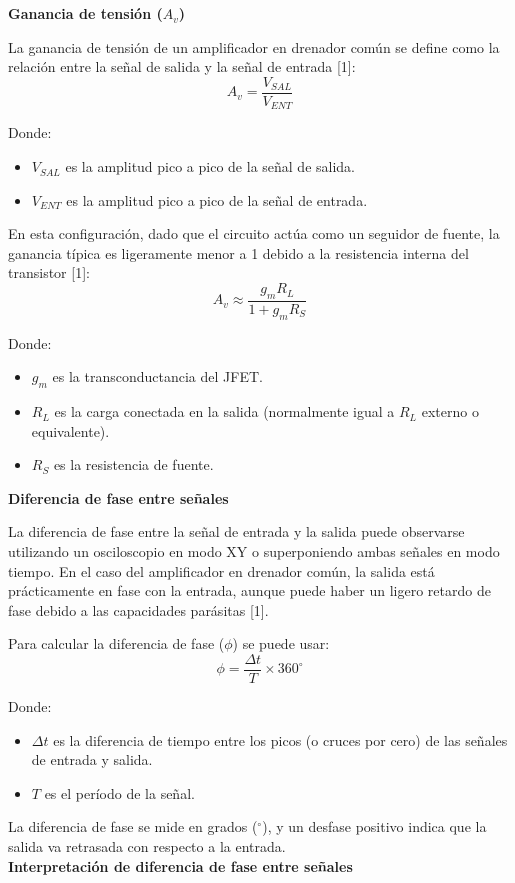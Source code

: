 \documentclass[journal]{IEEEtran}
\begin{document}
	\appendices
	\section{}
	\noindent\textbf{Ganancia de tensión ($A_v$)}
	\par La ganancia de tensión de un amplificador en drenador común se define como la relación entre la señal de salida y la señal de entrada [1]:
	\begin{equation}
	A_v = \frac{V_{SAL}}{V_{ENT}}
	\end{equation}
	\par Donde:
	\begin{itemize}
		\item $V_{SAL}$ es la amplitud pico a pico de la señal de salida.
		\item $V_{ENT}$ es la amplitud pico a pico de la señal de entrada.
	\end{itemize}
	\par En esta configuración, dado que el circuito actúa como un seguidor de fuente, la ganancia típica es ligeramente menor a 1 debido a la resistencia interna del transistor [1]:
	\begin{equation}
	A_v \approx \frac{g_m R_L}{1 + g_m R_S}
	\end{equation}
	\par Donde:
	\begin{itemize}
		\item $g_m$ es la transconductancia del JFET.
		\item $R_L$ es la carga conectada en la salida (normalmente igual a $R_L$ externo o equivalente).
		\item $R_S$ es la resistencia de fuente.
	\end{itemize}
	
	\textbf{Diferencia de fase entre señales}
	\par La diferencia de fase entre la señal de entrada y la salida puede observarse utilizando un osciloscopio en modo XY o superponiendo ambas señales en modo tiempo. En el caso del amplificador en drenador común, la salida está prácticamente en fase con la entrada, aunque puede haber un ligero retardo de fase debido a las capacidades parásitas [1].
	\par Para calcular la diferencia de fase ($\phi$) se puede usar:
	\begin{equation}
	\phi = \frac{\Delta t}{T} \times 360^\circ
	\end{equation}
	\par Donde:
	\begin{itemize}
		\item $\Delta t$ es la diferencia de tiempo entre los picos (o cruces por cero) de las señales de entrada y salida.
		\item $T$ es el período de la señal.
	\end{itemize}
	\par La diferencia de fase se mide en grados ($^\circ$), y un desfase positivo indica que la salida va retrasada con respecto a la entrada.
	\\
	\newline
	\textbf{Interpretación de diferencia de fase entre señales}
\end{document}

